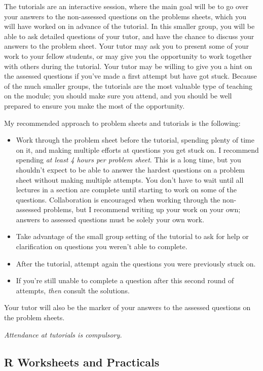 \documentclass[
  a4paper,
]{book}
\providecommand{\tightlist}{%
  \setlength{\itemsep}{0pt}\setlength{\parskip}{0pt}}
\theoremstyle{definition}
\theoremstyle{definition}
\theoremstyle{definition}
\theoremstyle{definition}
\theoremstyle{remark}
\begin{document}
The tutorials are an interactive session, where the main goal will be to go over your answers to the non-assessed questions on the problems sheets, which you will have worked on in advance of the tutorial. In this smaller group, you will be able to ask detailed questions of your tutor, and have the chance to discuss your answers to the problem sheet. Your tutor may ask you to present some of your work to your fellow students, or may give you the opportunity to work together with others during the tutorial. Your tutor may be willing to give you a hint on the assessed questions if you've made a first attempt but have got stuck. Because of the much smaller groups, the tutorials are the most valuable type of teaching on the module; you should make sure you attend, and you should be well prepared to ensure you make the most of the opportunity.

My recommended approach to problem sheets and tutorials is the following:

\begin{itemize}
\tightlist
\item
  Work through the problem sheet before the tutorial, spending plenty of time on it, and making multiple efforts at questions you get stuck on. I recommend spending \emph{at least 4 hours per problem sheet}. This is a long time, but you shouldn't expect to be able to answer the hardest questions on a problem sheet without making multiple attempts. You don't have to wait until all lectures in a section are complete until starting to work on some of the questions. Collaboration is encouraged when working through the non-assessed problems, but I recommend writing up your work on your own; answers to assessed questions must be solely your own work.
\item
  Take advantage of the small group setting of the tutorial to ask for help or clarification on questions you weren't able to complete.
\item
  After the tutorial, attempt again the questions you were previously stuck on.
\item
  If you're still unable to complete a question after this second round of attempts, \emph{then} consult the solutions.
\end{itemize}

Your tutor will also be the marker of your answers to the assessed questions on the problem sheets.

\emph{Attendance at tutorials is compulsory.}

\hypertarget{r-worksheets}{%
\subsection*{R Worksheets and Practicals}\label{r-worksheets}}
\end{document}
